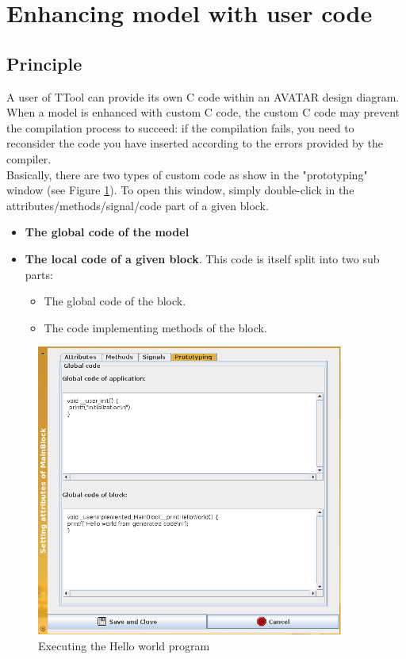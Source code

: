 \documentclass[12pt]{article}
\begin{document}
\newpage
\section{Enhancing model with user code}\label{sec:custom}

\subsection{Principle}
A user of TTool can provide its own C code within an AVATAR design diagram. When a model is enhanced with custom C code, the custom C code may prevent the compilation process to succeed: if the compilation fails, you need to reconsider the code you have inserted according to the errors provided by the compiler.\\
Basically, there are two types of custom code as show in the "prototyping" window (see Figure \ref{fig:customhelloworld}). To open this window, simply double-click in the attributes/methods/signal/code part of a given block.
\begin{itemize}
\item \textbf{The global code of the model}
\item \textbf{The local code of a given block}. This code is itself split into two sub parts:
\begin{itemize}
\item The global code of the block.
\item The code implementing methods of the block.
\end{itemize}
\end{itemize}

\begin{figure}[htbp]
\centering
\includegraphics[width=0.9\textwidth]{figures/customhelloworld}
\caption{Executing the Hello world program} \label{fig:customhelloworld}
\end{figure}
\end{document}
